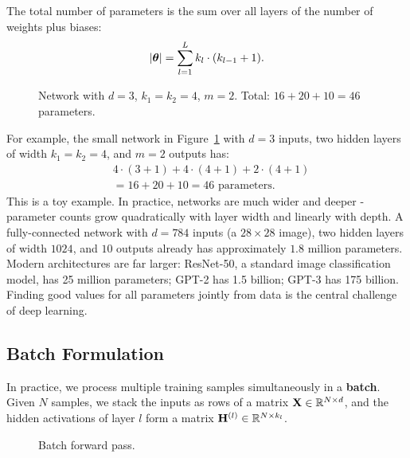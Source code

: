 The total number of parameters is the sum over all layers of the number of weights plus biases:
\begin{equation}
|\boldsymbol{\theta}| = \sum_{l=1}^{L} k_l \cdot (k_{l-1} + 1).
\end{equation}

\begin{figure}
\centering
{}
\resizebox{0.50\textwidth}{!}{}
\caption{Network with $d=3$, $k_1=k_2=4$, $m=2$. Total: $16+20+10=46$ parameters.}
\label{fig:mlp_dimensions}
\end{figure}

For example, the small network in Figure~\ref{fig:mlp_dimensions} with $d=3$ inputs, two hidden layers of width $k_1 = k_2 = 4$, and $m=2$ outputs has:
\begin{align}
& 4 \cdot (3+1) + 4 \cdot (4+1) + 2 \cdot (4+1) \nonumber\\
&= 16 + 20 + 10 = 46 \text{ parameters.}
\end{align}
This is a toy example. In practice, networks are much wider and deeper - parameter counts grow quadratically with layer width and linearly with depth. A fully-connected network with $d=784$ inputs (a $28\times28$ image), two hidden layers of width $1024$, and $10$ outputs already has approximately $1.8$ million parameters. Modern architectures are far larger: ResNet-50, a standard image classification model, has 25 million parameters; GPT-2 has 1.5 billion; GPT-3 has 175 billion. Finding good values for all parameters jointly from data is the central challenge of deep learning.


\subsection{Batch Formulation}

In practice, we process multiple training samples simultaneously in a \textbf{batch}. Given $N$ samples, we stack the inputs as rows of a matrix $\mathbf{X} \in \mathbb{R}^{N \times d}$, and the hidden activations of layer $l$ form a matrix $\mathbf{H}^{(l)} \in \mathbb{R}^{N \times k_l}$.

\begin{figure}
\centering
{}
\resizebox{0.38\textwidth}{!}{}
\caption{Batch forward pass.}
\label{fig:batch_matrix_multiply}
\end{figure}

